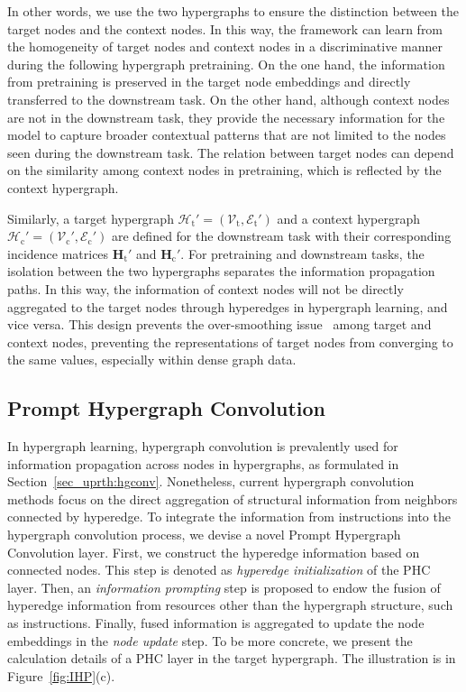In other words, we use the two hypergraphs to ensure the distinction between the target nodes and the context nodes.
In this way, the framework can learn from the homogeneity of target nodes and context nodes in a discriminative manner during the following hypergraph pretraining.
On the one hand, the information from pretraining is preserved in the target node embeddings and directly transferred to the downstream task. 
On the other hand, although context nodes are not in the downstream task, they provide the necessary information for the model to capture broader contextual patterns that are not limited to the nodes seen during the downstream task. 
The relation between target nodes can depend on the similarity among context nodes in pretraining, which is reflected by the context hypergraph. 

Similarly, a target hypergraph $\mathcal{H}_\text{t}' = (\mathcal{V}_\text{t},\mathcal{E}_\text{t}')$ and a context hypergraph $\mathcal{H}_\text{c}' = (\mathcal{V}_\text{c}',\mathcal{E}_\text{c}')$ are defined for the downstream task with their corresponding incidence matrices $\mathbf{H}_\text{t}'$ and $\mathbf{H}_\text{c}'$.
For pretraining and downstream tasks, the isolation between the two hypergraphs separates the information propagation paths. 
In this way, the information of context nodes will not be directly aggregated to the target nodes through hyperedges in hypergraph learning, and vice versa. 
This design prevents the over-smoothing issue~\cite{oversmooth1, oversmooth2} among target and context nodes, preventing the representations of target nodes from converging to the same values, especially within dense graph data.


\subsection{Prompt Hypergraph Convolution}
In hypergraph learning, hypergraph convolution is prevalently used for information propagation across nodes in hypergraphs, as formulated in Section~\ref{sec_uprth:hgconv}.
Nonetheless, current hypergraph convolution methods focus on the direct aggregation of structural information from neighbors connected by hyperedge. 
To integrate the information from instructions into the hypergraph convolution process, we devise a novel Prompt Hypergraph Convolution layer. First, we construct the hyperedge information based on connected nodes. 
This step is denoted as \textit{hyperedge initialization} of the PHC layer. 
Then, an \textit{information prompting} step is proposed to endow the fusion of hyperedge information from resources other than the hypergraph structure, such as instructions.
Finally, fused information is aggregated to update the node embeddings in the \textit{node update} step. 
To be more concrete, we present the calculation details of a PHC layer in the target hypergraph. 
The illustration is in Figure~\ref{fig:IHP}(c).

